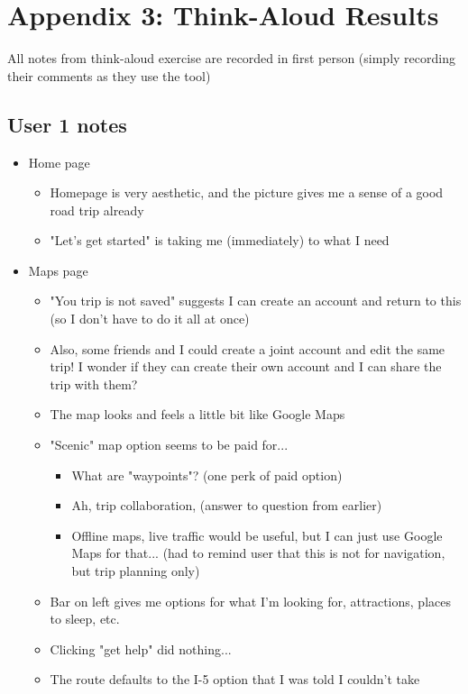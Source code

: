 \section{Appendix 3: Think-Aloud Results}
All notes from think-aloud exercise are recorded in first person (simply recording their comments as they use the tool)

\subsection{User 1 notes}

\begin{itemize}
\item Home page
  \begin{itemize}
  \item Homepage is very aesthetic, and the picture gives me a sense of a good road trip already
  \item "Let's get started" is taking me (immediately) to what I need
  \end{itemize}
\item Maps page
  \begin{itemize}
  \item "You trip is not saved" suggests I can create an account and return to this (so I don't have to do it all at once)
  \item Also, some friends and I could create a joint account and edit the same trip! I wonder if they can create their own account and I can share the trip with them?
  \item The map looks and feels a little bit like Google Maps
  \item "Scenic" map option seems to be paid for...
    \begin{itemize}
    \item What are "waypoints"? (one perk of paid option)
    \item Ah, trip collaboration, (answer to question from earlier)
    \item Offline maps, live traffic would be useful, but I can just use Google Maps for that... (had to remind user that this is not for navigation, but trip planning only)
    \end{itemize}
  \item Bar on left gives me options for what I'm looking for, attractions, places to sleep, etc.
  \item Clicking "get help" did nothing...
  \item The route defaults to the I-5 option that I was told I couldn't take

\end{itemize}
\end{itemize}
